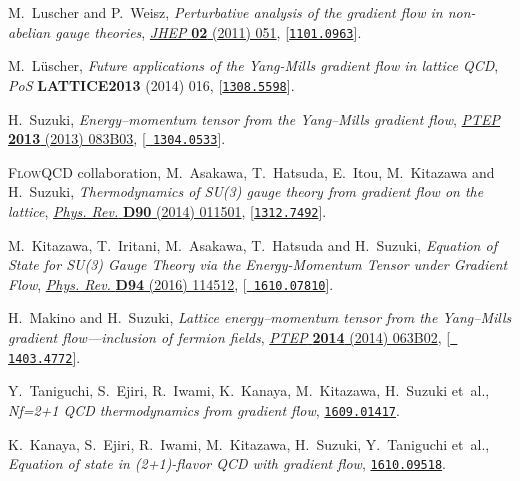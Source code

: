 \documentclass{PoS}
\begin{document}
\begin{thebibliography}{100}
M.~Luscher and P.~Weisz, \emph{{Perturbative analysis of the gradient flow in
  non-abelian gauge theories}},
  \href{http://dx.doi.org/10.1007/JHEP02(2011)051}{\emph{JHEP} {\bf 02} (2011)
  051}, [\href{https://arxiv.org/abs/1101.0963}{{\tt 1101.0963}}].

M.~L{\"u}scher, \emph{{Future applications of the Yang-Mills gradient flow in
  lattice QCD}}, {\emph{PoS} {\bf LATTICE2013} (2014) 016},
  [\href{https://arxiv.org/abs/1308.5598}{{\tt 1308.5598}}].

H.~Suzuki, \emph{{Energy--momentum tensor from the Yang--Mills gradient flow}},
  \href{http://dx.doi.org/10.1093/ptep/ptt059, 10.1093/ptep/ptv094}{\emph{PTEP}
  {\bf 2013} (2013) 083B03}, [\href{https://arxiv.org/abs/1304.0533}{{\tt
  1304.0533}}].

{\scshape FlowQCD} collaboration, M.~Asakawa, T.~Hatsuda, E.~Itou, M.~Kitazawa
  and H.~Suzuki, \emph{{Thermodynamics of SU(3) gauge theory from gradient flow
  on the lattice}}, \href{http://dx.doi.org/10.1103/PhysRevD.90.011501,
  10.1103/PhysRevD.92.059902}{\emph{Phys. Rev.} {\bf D90} (2014) 011501},
  [\href{https://arxiv.org/abs/1312.7492}{{\tt 1312.7492}}].

M.~Kitazawa, T.~Iritani, M.~Asakawa, T.~Hatsuda and H.~Suzuki, \emph{{Equation
  of State for SU(3) Gauge Theory via the Energy-Momentum Tensor under Gradient
  Flow}}, \href{http://dx.doi.org/10.1103/PhysRevD.94.114512}{\emph{Phys. Rev.}
  {\bf D94} (2016) 114512}, [\href{https://arxiv.org/abs/1610.07810}{{\tt
  1610.07810}}].

H.~Makino and H.~Suzuki, \emph{{Lattice energy--momentum tensor from the
  Yang--Mills gradient flow---inclusion of fermion fields}},
  \href{http://dx.doi.org/10.1093/ptep/ptu070, 10.1093/ptep/ptv095}{\emph{PTEP}
  {\bf 2014} (2014) 063B02}, [\href{https://arxiv.org/abs/1403.4772}{{\tt
  1403.4772}}].

Y.~Taniguchi, S.~Ejiri, R.~Iwami, K.~Kanaya, M.~Kitazawa, H.~Suzuki et~al.,
  \emph{{Nf=2+1 QCD thermodynamics from gradient flow}},
  \href{https://arxiv.org/abs/1609.01417}{{\tt 1609.01417}}.

K.~Kanaya, S.~Ejiri, R.~Iwami, M.~Kitazawa, H.~Suzuki, Y.~Taniguchi et~al.,
  \emph{{Equation of state in (2+1)-flavor QCD with gradient flow}},
\newblock \href{https://arxiv.org/abs/1610.09518}{{\tt 1610.09518}}.


\end{thebibliography}
\end{document}
